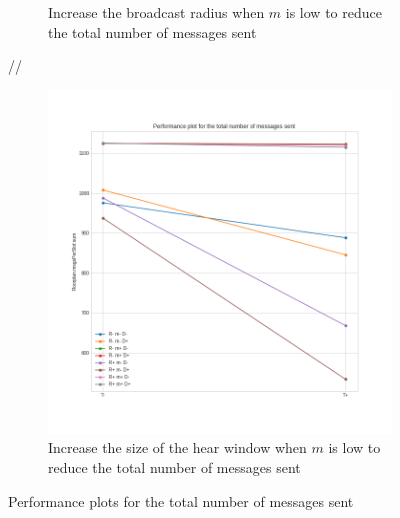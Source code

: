 \begin{figure}[htb]
\begin{subfigure}[b]{0.38\textwidth}
		\caption{Increase the broadcast radius when \(m\) is low to
		reduce the total number of messages
		sent}\label{subfig:hdperfmessagesR}
	\end{subfigure}//
	\begin{subfigure}[b]{0.37\textwidth}
		\centering
		\includegraphics[width=\textwidth]{img/hd/messages-T-perfplot}
		\caption{Increase the size of the hear window when \(m\) is low
		to reduce the total number of messages
		sent}\label{subfig:hdperfmessagesT}
	\end{subfigure}
	\caption{Performance plots for the total number of messages
	sent}\label{fig:hdperfmessages}
\end{figure}
